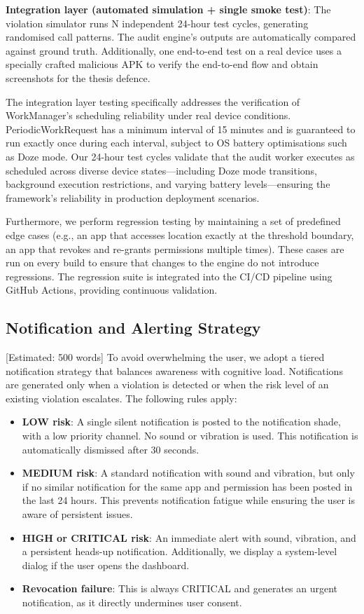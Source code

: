 \textbf{Integration layer (automated simulation + single smoke test)}: The violation simulator runs N independent 24-hour test cycles, generating randomised call patterns. The audit engine's outputs are automatically compared against ground truth. Additionally, one end-to-end test on a real device uses a specially crafted malicious APK to verify the end-to-end flow and obtain screenshots for the thesis defence.

The integration layer testing specifically addresses the verification of WorkManager's scheduling reliability under real device conditions. PeriodicWorkRequest has a minimum interval of 15 minutes and is guaranteed to run exactly once during each interval, subject to OS battery optimisations such as Doze mode. Our 24-hour test cycles validate that the audit worker executes as scheduled across diverse device states—including Doze mode transitions, background execution restrictions, and varying battery levels—ensuring the framework's reliability in production deployment scenarios.

Furthermore, we perform regression testing by maintaining a set of predefined edge cases (e.g., an app that accesses location exactly at the threshold boundary, an app that revokes and re-grants permissions multiple times). These cases are run on every build to ensure that changes to the engine do not introduce regressions. The regression suite is integrated into the CI/CD pipeline using GitHub Actions, providing continuous validation.

\subsection{Notification and Alerting Strategy} [Estimated: 500 words]
To avoid overwhelming the user, we adopt a tiered notification strategy that balances awareness with cognitive load. Notifications are generated only when a violation is detected or when the risk level of an existing violation escalates. The following rules apply:

\begin{itemize}
\item \textbf{LOW risk}: A single silent notification is posted to the notification shade, with a low priority channel. No sound or vibration is used. This notification is automatically dismissed after 30 seconds.
\item \textbf{MEDIUM risk}: A standard notification with sound and vibration, but only if no similar notification for the same app and permission has been posted in the last 24 hours. This prevents notification fatigue while ensuring the user is aware of persistent issues.
\item \textbf{HIGH or CRITICAL risk}: An immediate alert with sound, vibration, and a persistent heads-up notification. Additionally, we display a system-level dialog if the user opens the dashboard.
\item \textbf{Revocation failure}: This is always CRITICAL and generates an urgent notification, as it directly undermines user consent.
\end{itemize}

